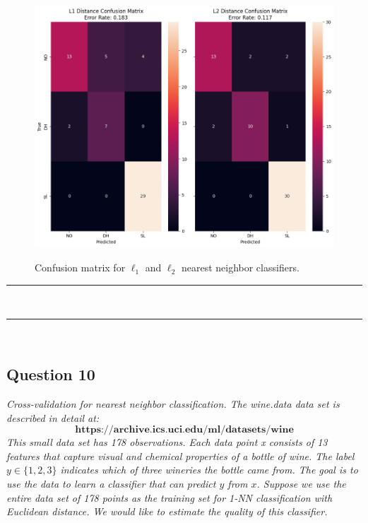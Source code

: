 \documentclass{article}
\begin{document}
\begin{figure}[htbp]
\includegraphics[width=1\textwidth]{q9.png} \\
\caption{Confusion matrix for $\ell_1$ and $\ell_2$ nearest neighbor classifiers.}
\label{fig:image_comparison}
\end{figure} 
      
\noindent\rule{\textwidth}{0.4pt}\\

\noindent\rule{\textwidth}{0.4pt}\\

\newpage
\subsection*{Question 10}
\textit{Cross-validation for nearest neighbor classification.
The wine.data data set is described in detail at:\newline \newline$$\textbf{https://archive.ics.uci.edu/ml/datasets/wine}$$
\newline This small data set has 178 observations. Each data point x consists of 13 features that capture visual
and chemical properties of a bottle of wine. The label $y \in \{1,2,3\}$ indicates which of three wineries
the bottle came from. The goal is to use the data to learn a classifier that can predict $y$ from $x$.\newline
\newline Suppose we use the entire data set of 178 points as the training set for 1-NN classification with Euclidean distance. We would like to estimate the quality of this classifier.}\\
\end{document}
